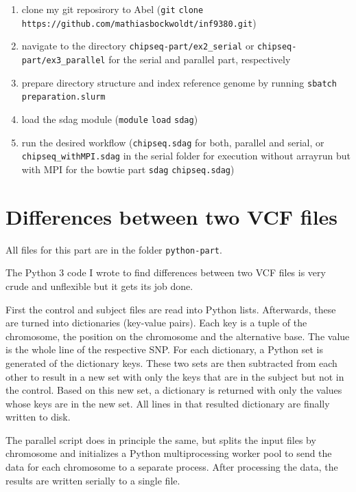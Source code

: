 \documentclass[paper=a4, 12pt]{scrartcl}
\begin{document}
\begin{flushleft}
\begin{enumerate}
\item clone my git reposirory to Abel (\texttt{git} \texttt{clone} \texttt{https://}\allowbreak\texttt{github.com/}\allowbreak\texttt{mathiasbockwoldt/}\allowbreak\texttt{inf9380.git})
\item navigate to the directory \texttt{chipseq-part/}\allowbreak\texttt{ex2\_serial} or \texttt{chipseq-part/}\allowbreak\texttt{ex3\_parallel} for the serial and parallel part, respectively
\item prepare directory structure and index reference genome by running \texttt{sbatch} \texttt{preparation.slurm}
\item load the sdag module (\texttt{module} \texttt{load} \texttt{sdag})
\item run the desired workflow (\texttt{chipseq.sdag} for both, parallel and serial, or \texttt{chipseq\_withMPI.sdag} in the serial folder for execution without arrayrun but with MPI for the bowtie part \texttt{sdag} \texttt{chipseq.sdag})
\end{enumerate}
\end{flushleft}


\section{Differences between two VCF files}

All files for this part are in the folder \texttt{python-part}.

The Python 3 code I wrote to find differences between two VCF files is very crude and unflexible but it gets its job done.

First the control and subject files are read into Python lists. Afterwards, these are turned into dictionaries (key-value pairs). Each key is a tuple of the chromosome, the position on the chromosome and the alternative base. The value is the whole line of the respective SNP. For each dictionary, a Python set is generated of the dictionary keys. These two sets are then subtracted from each other to result in a new set with only the keys that are in the subject but not in the control. Based on this new set, a dictionary is returned with only the values whose keys are in the new set. All lines in that resulted dictionary are finally written to disk.

The parallel script does in principle the same, but splits the input files by chromosome and initializes a Python multiprocessing worker pool to send the data for each chromosome to a separate process. After processing the data, the results are written serially to a single file.
\end{document}
